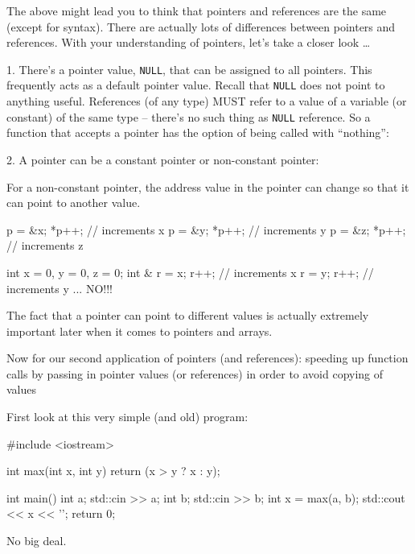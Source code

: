 The above might lead you to think that pointers and references are the same (except for syntax). There are actually lots of differences between pointers and references. With your understanding of pointers, let's take a closer look \ldots

1. There's a pointer value, \texttt{NULL}, that can be assigned to all pointers. This frequently acts as a default pointer value. Recall that \texttt{NULL} does not point to anything useful. References (of any type) MUST refer to a value of a variable (or constant) of the same type -- there's no such thing as \texttt{NULL} reference. So a function that accepts a pointer has the option of being called with ``nothing'':

2. A pointer can be a constant pointer or non-constant pointer:


For a non-constant pointer, the address value in the pointer can change so that it can point to another value.

\begin{consolethree}[escapeinside=||]
p = &x; *p++; // increments x
p = &y; *p++; // increments y
p = &z; *p++; // increments z
\end{consolethree}

\begin{consolethree}[escapeinside=||]
int x = 0, y = 0, z = 0;
int & r = x; r++;           // increments x
r = y; r++;                 // increments y ... NO!!!
\end{consolethree}
The fact that a pointer can point to different values is actually extremely important later when it comes to pointers and arrays.

\newpage{}

Now for our second application of pointers (and references): speeding up function calls by passing in pointer values (or references) in order to avoid copying of values

First look at this very simple (and old) program:

\begin{consolethree}[escapeinside=||]
#include <iostream>

int max(int x, int y)
{
    return (x > y ? x : y);
}

int main()
{
    int a;
    std::cin >> a;
    int b;
    std::cin >> b;
    int x = max(a, b);
    std::cout << x << '\n';
    return 0;
}
\end{consolethree}
No big deal.


